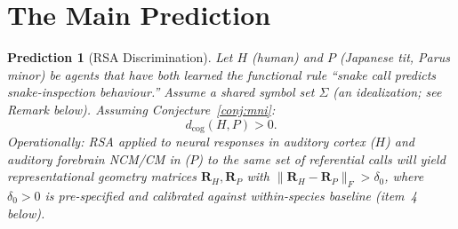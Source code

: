 \documentclass[12pt]{article}
\newtheorem{prediction}{Prediction}
\begin{document}
\section{The Main Prediction}

\begin{prediction}[RSA Discrimination]
\label{pred:rsa}
Let $H$ (human) and $P$ (Japanese tit, \textit{Parus minor})
be agents that have both learned the functional rule
``snake call predicts snake-inspection behaviour.''
Assume a shared symbol set $\Sigma$ (an idealization; see Remark below).
Assuming Conjecture~\ref{conj:mni}:
\[
d_\mathrm{cog}(H, P) > 0.
\]
Operationally: RSA \citep{kriegeskorte2008}
applied to neural responses in auditory cortex ($H$)
and auditory forebrain NCM/CM \citep{mello1992} in ($P$)
to the same set of referential calls
will yield representational geometry matrices
$\mathbf{R}_H, \mathbf{R}_P$ with
$\|\mathbf{R}_H - \mathbf{R}_P\|_F > \delta_0$,
where $\delta_0 > 0$ is pre-specified
and calibrated against within-species baseline (item~4 below).
\end{prediction}
\end{document}
